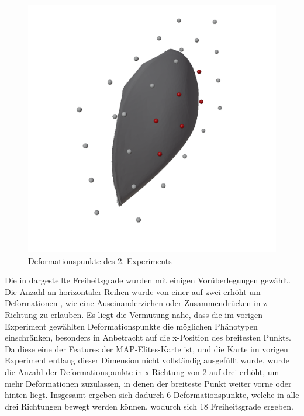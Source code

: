 \begin{figure}[h]
	\includegraphics[width=.7\linewidth]{bilder/6ptDeformationPoints}
	\caption{Deformationspunkte des 2. Experiments}
	\label{fig:ffd2nd}
\end{figure}
Die in \todo{} dargestellte Freiheitsgrade wurden mit einigen Vorüberlegungen gewählt.
Die Anzahl an horizontaler Reihen wurde von einer auf zwei erhöht um Deformationen , wie eine Auseinanderziehen oder Zusammendrücken in z-Richtung zu erlauben.
Es liegt die Vermutung nahe, dass die im vorigen Experiment gewählten Deformationspunkte die möglichen Phänotypen einschränken, besonders in Anbetracht auf die x-Position des breitesten Punkts.
Da diese eine der Features der MAP-Elites-Karte ist, und die Karte im vorigen Experiment entlang dieser Dimension nicht vollständig ausgefüllt wurde, wurde die Anzahl der Deformationspunkte in x-Richtung von 2 auf drei erhöht, um mehr Deformationen zuzulassen, in denen der breiteste Punkt weiter vorne oder hinten liegt.
Insgesamt ergeben sich dadurch 6 Deformationspunkte, welche in alle drei Richtungen bewegt werden können, wodurch sich 18 Freiheitsgrade ergeben.

